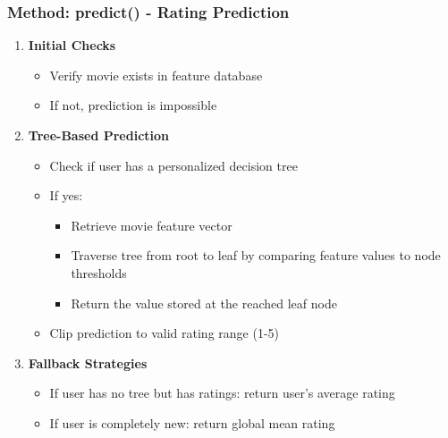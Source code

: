 \documentclass{beamer}
\begin{document}
\begin{frame}
\frametitle{Method: predict() - Rating Prediction}

\begin{enumerate}
    \item \textbf{Initial Checks}
    \begin{itemize}
        \item Verify movie exists in feature database
        \item If not, prediction is impossible
    \end{itemize}
    
    \item \textbf{Tree-Based Prediction}
    \begin{itemize}
        \item Check if user has a personalized decision tree
        \item If yes:
        \begin{itemize}
            \item Retrieve movie feature vector
            \item Traverse tree from root to leaf by comparing feature values to node thresholds
            \item Return the value stored at the reached leaf node
        \end{itemize}
        \item Clip prediction to valid rating range (1-5)
    \end{itemize}
    
    \item \textbf{Fallback Strategies}
    \begin{itemize}
        \item If user has no tree but has ratings: return user's average rating
        \item If user is completely new: return global mean rating
    \end{itemize}
\end{enumerate}
\end{frame}
\end{document}
